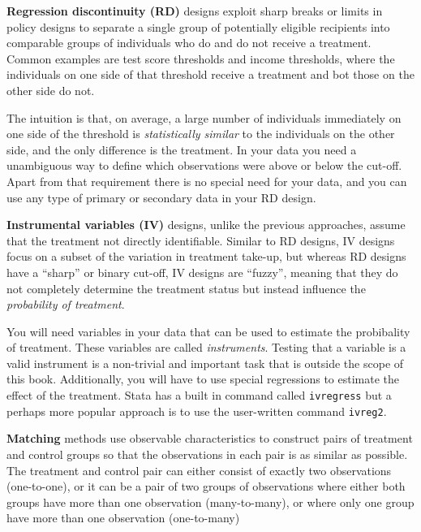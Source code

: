 \textbf{Regression discontinuity (RD)} designs exploit sharp breaks or limits
in policy designs to separate a single group of potentially eligible recipients
into comparable groups of individuals who do and do not receive a treatment. 
Common examples are test score thresholds and income thresholds, 
where the individuals on one side of that threshold receive a treatment and bot those on the other side do not.

The intuition is that, on average, a large number of individuals immediately on one side of the threshold
is \textit{statistically similar} to the individuals on the other side, 
and the only difference is the treatment. 
In your data you need a unambiguous way to define which observations were above or below the cut-off.
Apart from that requirement there is no special need for your data,
and you can use any type of primary or secondary data in your RD design.



\textbf{Instrumental variables (IV)} designs, unlike the previous approaches,
assume that the treatment not directly identifiable.
Similar to RD designs,
IV designs focus on a subset of the variation in treatment take-up, 
but whereas RD designs have a ``sharp'' or binary cut-off,
IV designs are ``fuzzy'', meaning that they do not completely determine
the treatment status but instead influence the \textit{probability of treatment}.

You will need variables in your data that can be used to estimate the probibality of treatment. 
These variables are called \textit{instruments}. 
Testing that a variable is a valid instrument is a non-trivial and important task
that is outside the scope of this book.
Additionally, you will have to use special regressions to estimate the effect of the treatment.
Stata has a built in command called \texttt{ivregress} but a perhaps more popular approach is to use the user-written command \texttt{ivreg2}.


\textbf{Matching}
methods use observable characteristics to construct pairs of treatment and control groups
so that the observations in each pair is as similar as possible. 
The treatment and control pair can either consist of exactly two observations (one-to-one),
or it can be a pair of two groups of observations where either both groups have more than one observation (many-to-many),
or where only one group have more than one observation (one-to-many)

